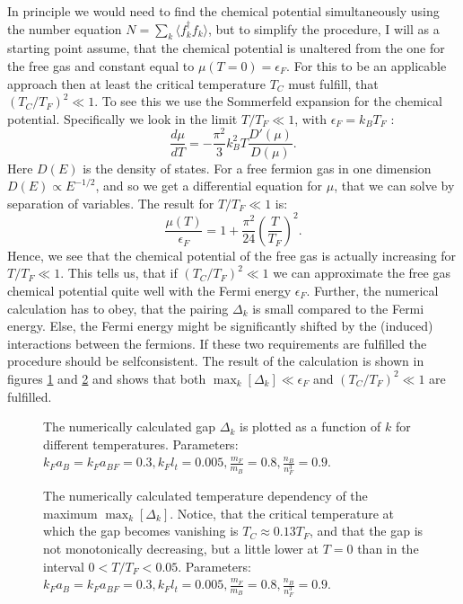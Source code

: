 In principle we would need to find the chemical potential simultaneously using the number equation $N = \sum_k \langle f_k^\dagger f_k \rangle$, but to simplify the procedure, I will as a starting point assume, that the chemical potential is unaltered from the one for the free gas and constant equal to $\mu(T=0) = \epsilon_F$. For this to be an applicable approach then at least the critical temperature $T_C$ must fulfill, that $\left(T_C/T_F\right)^2 \ll 1$. To see this we use the Sommerfeld expansion for the chemical potential. Specifically we look in the limit $T/T_F \ll 1$, with $\epsilon_F = k_B T_F$ \cite{GiuseppeGiuseppe}: 
\begin{equation}
\frac{d\mu}{dT} = -\frac{\pi^2}{3}k_B^2 T \frac{D'(\mu)}{D(\mu)}. \nonumber
\end{equation}
Here $D(E)$ is the density of states. For a free fermion gas in one dimension $D(E)\propto E^{-1/2}$, and so we get a differential equation for $\mu$, that we can solve by separation of variables. The result for $T/T_F\ll 1$ is:
\begin{equation}
\frac{\mu(T)}{\epsilon_F} = 1 + \frac{\pi^2}{24}\left(\frac{T}{T_F}\right)^2.
\end{equation}
Hence, we see that the chemical potential of the free gas is actually increasing for $T/T_F \ll 1$. This tells us, that if $(T_C/T_F)^2 \ll 1$ we can approximate the free gas chemical potential quite well with the Fermi energy $\epsilon_F$. Further, the numerical calculation has to obey, that the pairing $\Delta_k$ is small compared to the Fermi energy. Else, the Fermi energy might be significantly shifted by the (induced) interactions between the fermions. If these two requirements are fulfilled the procedure should be selfconsistent. The result of the calculation is shown in figures \ref{fig.Deltakkdepend} and \ref{fig.maxkDeltakTdepend} and shows that both $\max_k[\Delta_k] \ll \epsilon_F$ and $(T_C/T_F)^2 \ll 1$ are fulfilled. 

\begin{figure} 
\begin{center}  
  
\caption{The numerically calculated gap $\Delta_k$ is plotted as a function of $k$ for different temperatures. Parameters: $k_F a_B = k_F a_{BF} = 0.3, k_F l_t = 0.005, \frac{m_F}{m_B} = 0.8, \frac{n_B}{n_F^3} = 0.9$. }  
\label{fig.Deltakkdepend}  
\end{center}    
\end{figure}

\begin{figure} 
\begin{center}  
  
\caption{The numerically calculated temperature dependency of the maximum $\max_k[\Delta_k]$. Notice, that the critical temperature at which the gap becomes vanishing is $T_C \approx 0.13 T_F$, and that the gap is not monotonically decreasing, but a little lower at $T = 0$ than in the interval $0<T/T_F<0.05$. Parameters: $k_F a_B = k_F a_{BF} = 0.3, k_F l_t = 0.005, \frac{m_F}{m_B} = 0.8, \frac{n_B}{n_F^3} = 0.9$. }  
\label{fig.maxkDeltakTdepend}  
\end{center}    
\end{figure}

